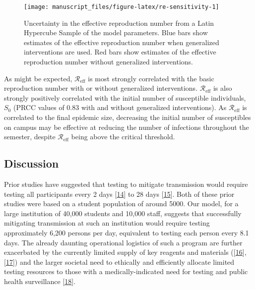 \documentclass[
]{article}
\begin{document}
\begin{figure}

{\centering \texttt{[image: manuscript\_files/figure-latex/re-sensitivity-1]} 

}

\caption{\label{fig:re-sensitivity}Uncertainty in the effective reproduction number from a Latin Hypercube Sample of the model parameters. Blue bars show estimates of the effective reproduction number when generalized interventions are used. Red bars show estimates of the effective reproduction number without generalized interventions.}\label{fig:re-sensitivity}
\end{figure}

As might be expected, \(\mathcal{R}_\text{eff}\) is most strongly
correlated with the basic reproduction number with or without
generalized interventions. \(\mathcal{R}_\text{eff}\) is also strongly
positively correlated with the initial number of susceptible
individuals, \(S_0\) (PRCC values of \(0.83\) with and without
generalized interventions). As \(\mathcal{R}_\text{eff}\) is correlated
to the final epidemic size, decreasing the initial number of
susceptibles on campus may be effective at reducing the number of
infections throughout the semester, despite \(\mathcal{R}_\text{eff}\)
being above the critical threshold.

\hypertarget{discussion}{%
\subsection{Discussion}\label{discussion}}

Prior studies have suggested that testing to mitigate transmission would
require testing all participants every 2 days
{[}\protect\hyperlink{ref-Paltiel2020-yp}{14}{]} to 28 days
{[}\protect\hyperlink{ref-Bradley2020-ig}{15}{]}. Both of these prior
studies were based on a student population of around 5000. Our model,
for a large institution of 40,000 students and 10,000 staff, suggests
that successfully mitigating transmission at such an institution would
require testing approximately 6,200 persons per day, equivalent to
testing each person every 8.1 days. The already daunting operational
logistics of such a program are further exacerbated by the currently
limited supply of key reagents and materials
({[}\protect\hyperlink{ref-Wu2020-bc}{16}{]},
{[}\protect\hyperlink{ref-Armour2020-pr}{17}{]}) and the larger societal
need to ethically and efficiently allocate limited testing resources to
those with a medically-indicated need for testing and public health
surveillance
{[}\protect\hyperlink{ref-American_Medical_Association2020-mi}{18}{]}.
\end{document}
